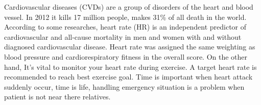Cardiovascular diseases (CVDs) are a group of disorders of the heart and blood vessel. In 2012 it kills 17 million people, makes 31\% of all death in the world. 
According to some researches, heart rate (HR) is an independent predictor of cardiovascular and all-cause mortality in men and women with and without diagnosed cardiovascular disease. Heart rate was assigned the same weighting as blood pressure and cardiorespiratory fitness in the overall score. On the other hand, It's vital to monitor your heart rate during exercise. A target heart rate is recommended to reach best exercise goal. Time is important when heart attack suddenly occur, time is life, handling emergency situation is a problem when patient is not near there relatives. 
